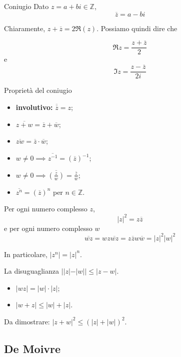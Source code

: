\documentclass[a4paper]{article}
\begin{document}
\begin{snippetdefinition}{Coniugio}
    Dato \(z=a+bi\in\mathbb{Z}\),
    \[
        \overline{z} = a-bi
    \]
\end{snippetdefinition}

Chiaramente, \(z + \overline{z} = 2\Re(z)\). Possiamo quindi dire che

\[
    \Re z = \frac{z + \overline{z}}{2}
\]
e
\[
    \Im z = \frac{z-\overline{z}}{2i}
\]

\begin{snippetproposition}{Proprietà del coniugio}
    \begin{itemize}
        \item \textbf{involutivo:} \(\overline{\overline{z}} = z\);
        \item \(\overline{z+w} = \overline{z} + \overline{w}\);
        \item \(\overline{zw} = \overline{z}\cdot\overline{w}\);
        \item \(w \neq 0 \implies \overline{z^{-1}} = {\left(\overline{z}\right)}^{-1}\);
        \item \(w \neq 0 \implies \overline{\left(\frac{z}{w}\right)} = \frac{\overline{z}}{\overline{w}}\);
        \item \(\overline{z^n} = {(\overline{z})}^n\) per \(n\in\mathbb{Z}\).
    \end{itemize}
\end{snippetproposition}

Per ogni numero complesso \(z\),
\[
    {|z|}^2 = z\overline{z}
\]
e per ogni numero complesso \(w\)
\[
    \overline{wz} = wz\overline{wz} = z\overline{z}w\overline{w} = |z|^2|w|^2
\]

In particolare, \(|z^n| = |z|^n\).

La disuguaglianza \(||z| - |w|| \leq |z-w|\).

\begin{itemize}
    \item \(|wz| = |w|\cdot|z|\);
    \item \(|w+z| \leq |w| + |z|\).
\end{itemize}


Da dimostrare: \(|z+w|^2 \leq {(|z| + |w|)}^2\).

\subsection{De Moivre}
\end{document}
